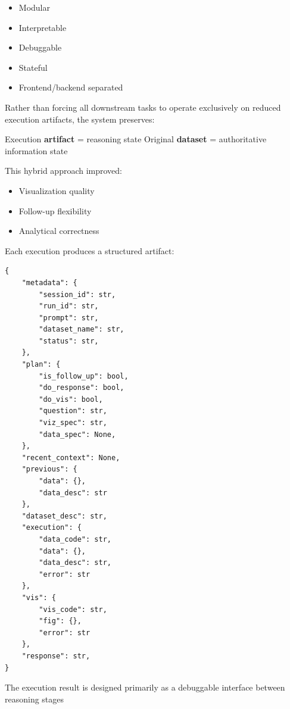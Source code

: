 \documentclass[12pt, oneside]{report}
\begin{document}
\begin{itemize}
    \item Modular
    \item Interpretable
    \item Debuggable
    \item Stateful
    \item Frontend/backend separated
\end{itemize}


Rather than forcing all downstream tasks to operate exclusively on reduced execution artifacts, the system preserves:


Execution \textbf{artifact} = reasoning state
\hfill
Original \textbf{dataset} = authoritative information state

This hybrid approach improved:

\begin{itemize}
    \item Visualization quality
    \item Follow-up flexibility
    \item Analytical correctness
\end{itemize}





Each execution produces a structured artifact:

\begin{verbatim}
{
    "metadata": {
        "session_id": str,
        "run_id": str,
        "prompt": str,
        "dataset_name": str,
        "status": str,
    },
    "plan": {
        "is_follow_up": bool,
        "do_response": bool,
        "do_vis": bool,
        "question": str,
        "viz_spec": str,
        "data_spec": None,
    },
    "recent_context": None,
    "previous": {
        "data": {},
        "data_desc": str
    },
    "dataset_desc": str,
    "execution": {
        "data_code": str,
        "data": {},
        "data_desc": str,
        "error": str
    },
    "vis": {
        "vis_code": str,
        "fig": {},
        "error": str
    },
    "response": str,
}
\end{verbatim}


The execution result is designed primarily as a debuggable interface between reasoning stages
\end{document}
